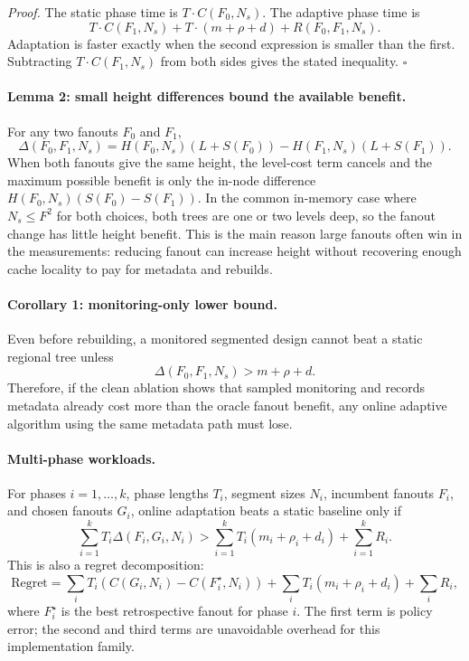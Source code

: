 \emph{Proof.}
The static phase time is $T\cdot C(F_0,N_s)$.  The adaptive phase time is
\[
  T\cdot C(F_1,N_s) + T\cdot(m+\rho+d) + R(F_0,F_1,N_s).
\]
Adaptation is faster exactly when the second expression is smaller than the
first.  Subtracting $T\cdot C(F_1,N_s)$ from both sides gives the stated
inequality. $\square$

\paragraph{Lemma 2: small height differences bound the available benefit.}
For any two fanouts $F_0$ and $F_1$,
\[
  \Delta(F_0,F_1,N_s)
  =
  H(F_0,N_s)(L+S(F_0)) - H(F_1,N_s)(L+S(F_1)).
\]
When both fanouts give the same height, the level-cost term cancels and the
maximum possible benefit is only the in-node difference
$H(F_0,N_s)(S(F_0)-S(F_1))$.  In the common in-memory case where
$N_s \le F^2$ for both choices, both trees are one or two levels deep, so the
fanout change has little height benefit.  This is the main reason large fanouts
often win in the measurements: reducing fanout can increase height without
recovering enough cache locality to pay for metadata and rebuilds.

\paragraph{Corollary 1: monitoring-only lower bound.}
Even before rebuilding, a monitored segmented design cannot beat a static
regional tree unless
\[
  \Delta(F_0,F_1,N_s) > m+\rho+d.
\]
Therefore, if the clean ablation shows that sampled monitoring and records
metadata already cost more than the oracle fanout benefit, any online adaptive
algorithm using the same metadata path must lose.

\paragraph{Multi-phase workloads.}
For phases $i=1,\ldots,k$, phase lengths $T_i$, segment sizes $N_i$, incumbent
fanouts $F_i$, and chosen fanouts $G_i$, online adaptation beats a static
baseline only if
\[
  \sum_{i=1}^k T_i\Delta(F_i,G_i,N_i)
  >
  \sum_{i=1}^k T_i(m_i+\rho_i+d_i)
  +
  \sum_{i=1}^k R_i .
\]
This is also a regret decomposition:
\[
  \text{Regret}
  =
  \sum_i T_i\left(C(G_i,N_i)-C(F_i^\star,N_i)\right)
  +
  \sum_i T_i(m_i+\rho_i+d_i)
  +
  \sum_i R_i ,
\]
where $F_i^\star$ is the best retrospective fanout for phase $i$.  The first
term is policy error; the second and third terms are unavoidable overhead for
this implementation family.

